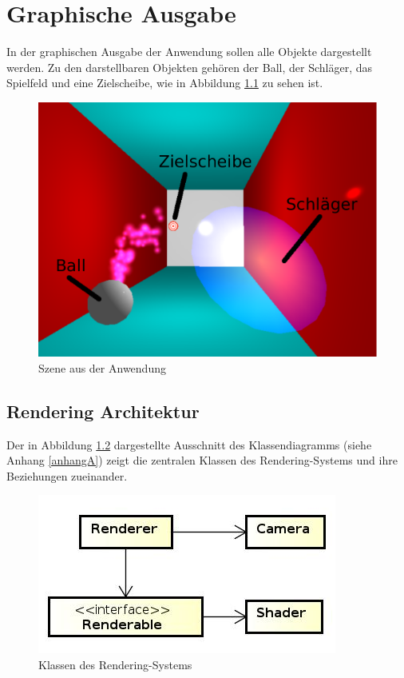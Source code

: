 
\chapter{Graphische Ausgabe}
\label{Kapitel 2}
%
In der graphischen Ausgabe der Anwendung sollen alle Objekte dargestellt werden. Zu den darstellbaren Objekten gehören der Ball, der Schläger, das Spielfeld und eine Zielscheibe, wie in Abbildung \ref{fig:gameScene} zu sehen ist.

\begin{figure}[h]
	\centering
	\includegraphics[width=0.6\linewidth]{bilder/gameScene2}
	\caption{Szene aus der Anwendung}
	\label{fig:gameScene}
\end{figure}


\section{Rendering Architektur}
\label{Kapitel_2_-_Unterkapitel_1}
%
Der in Abbildung \ref{fig:renderingSystem} dargestellte Ausschnitt des Klassendiagramms (siehe Anhang \ref{anhangA}) zeigt die zentralen Klassen des Rendering-Systems und ihre Beziehungen zueinander.

\begin{figure}[h]
	\centering
	\includegraphics[width=0.6\linewidth]{bilder/RenderingSystem}
	\caption{Klassen des Rendering-Systems}
	\label{fig:renderingSystem}
\end{figure}

